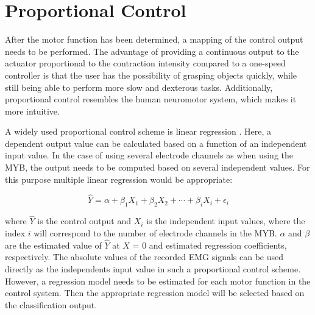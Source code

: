 \section{Proportional Control}
After the motor function has been determined, a mapping of the control output needs to be performed. The advantage of providing a continuous output to the actuator proportional to the contraction intensity compared to a one-speed controller is that the user has the possibility of grasping objects quickly, while still being able to perform more slow and dexterous tasks. Additionally, proportional control resembles the human neuromotor system, which makes it more intuitive. \cite{Fougner2012} 

A widely used proportional control scheme is linear regression \cite{Fougner2012}. Here, a dependent output value can be calculated based on a function of an independent input value. In the case of using several electrode channels as when using the MYB, the output needs to be computed based on several independent values. For this purpose multiple linear regression would be appropriate:

\begin{equation}
	\hat{Y} = \alpha+\beta_{1}X_{1}+\beta_{2}X_{2}+\cdots+\beta_{i}X_{i}+\epsilon_{i}
\end{equation}

where $\hat{Y}$ is the control output and $X_{i}$ is the independent input values, where the index $i$ will correspond to the number of electrode channels in the MYB. $\alpha$ and $\beta$ are the estimated value of $\hat{Y}$ at $X$ = 0 and estimated regression coefficients, respectively. The absolute values of the recorded EMG signals can be used directly as the independents input value in such a proportional control scheme. \cite{Zar2009} However, a regression model needs to be estimated for each motor function in the control system. Then the appropriate regression model will be selected based on the classification output.  